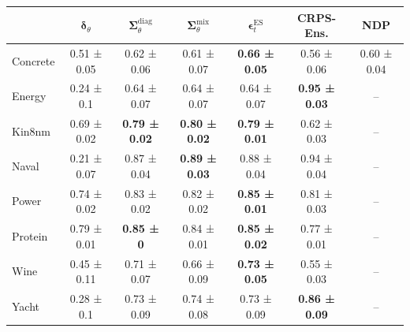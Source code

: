 \begin{tabular}{l|c|c|c|c|c|c}
\toprule
 & $\bm\delta_\theta$ & $\bm\Sigma_\theta^{\mathrm{diag}}$ & $\bm\Sigma_\theta^{\mathrm{mix}}$ & $\bm\epsilon_t^\mathrm{ES}$ & CRPS-Ens. & NDP \\
\midrule
Concrete & 0.51 ± 0.05 & 0.62 ± 0.06 & 0.61 ± 0.07 & \textbf{0.66 ± 0.05} & 0.56 ± 0.06 & 0.60 ± 0.04 \\
Energy & 0.24 ± 0.1 & 0.64 ± 0.07 & 0.64 ± 0.07 & 0.64 ± 0.07 & \textbf{0.95 ± 0.03} & -- \\
Kin8nm & 0.69 ± 0.02 & \textbf{0.79 ± 0.02} & \textbf{0.80 ± 0.02} & \textbf{0.79 ± 0.01} & 0.62 ± 0.03 & -- \\
Naval & 0.21 ± 0.07 & 0.87 ± 0.04 & \textbf{0.89 ± 0.03} & 0.88 ± 0.04 & 0.94 ± 0.04 & -- \\
Power & 0.74 ± 0.02 & 0.83 ± 0.02 & 0.82 ± 0.02 & \textbf{0.85 ± 0.01} & 0.81 ± 0.03 & -- \\
Protein & 0.79 ± 0.01 & \textbf{0.85 ± 0} & 0.84 ± 0.01 & \textbf{0.85 ± 0.02} & 0.77 ± 0.01 & -- \\
Wine & 0.45 ± 0.11 & 0.71 ± 0.07 & 0.66 ± 0.09 & \textbf{0.73 ± 0.05} & 0.55 ± 0.03 & -- \\
Yacht & 0.28 ± 0.1 & 0.73 ± 0.09 & 0.74 ± 0.08 & 0.73 ± 0.09 & \textbf{0.86 ± 0.09} & -- \\
\bottomrule
\end{tabular}
